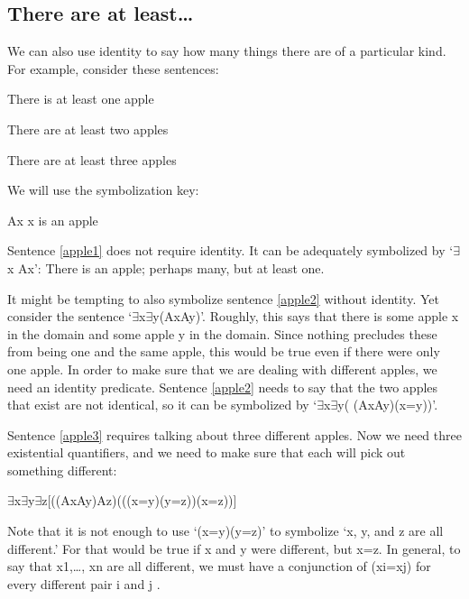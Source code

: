 \subsection{There are at least\ldots}

We can also use identity to say how many things there are of a particular kind. For example, consider these sentences:
\begin{earg}
\item[\ex{apple1}] There is at least one apple
\item[\ex{apple2}] There are at least two apples
\item[\ex{apple3}] There are at least three apples
\end{earg}
We will use the symbolization key:
\begin{ekey}
\item[Ax] x is an apple
\end{ekey}
Sentence \ref{apple1} does not require identity. It can be adequately symbolized by ‘$\exists$x Ax’: There is an apple; perhaps many, but at least one.

It might be tempting to also symbolize sentence \ref{apple2} without identity. Yet consider the sentence ‘$\exists$x$\exists$y(Ax\eand Ay)’. Roughly, this says that there is some apple x in the domain and some apple y in the domain. Since nothing precludes these from being one and the same apple, this would be true even if there were only one apple. In order to make sure that we are dealing with different apples, we need an identity predicate. Sentence \ref{apple2} needs to say that the two apples that exist are not identical, so it can be symbolized by ‘$\exists$x$\exists$y( (Ax\eand Ay)\eand \enot (x=y))’.

Sentence \ref{apple3} requires talking about three different apples. Now we need three existential quantifiers, and we need to make sure that each will pick out something different:
\begin{center}
$\exists$x$\exists$y$\exists$z[((Ax\eand Ay)\eand Az)\eand ((\enot (x=y)\eand \enot (y=z))\eand \enot (x=z))]
\end{center}
Note that it is not enough to use ‘\enot (x=y)\eand \enot (y=z)’ to symbolize ‘x, y, and z are all different.’ For that would be true if x and y were different, but x=z. In general, to say that x1,\ldots, xn are all different, we must have a conjunction of \enot (xi=xj) for every different pair i and j .
